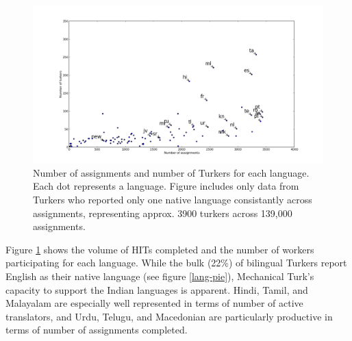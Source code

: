 \documentclass[11pt]{article}
\begin{document}
\begin{figure}[h]
\centering
\includegraphics[width=6in]{figures/assign-turk-scatter-new}
\caption{Number of assignments and number of Turkers for each language. Each dot represents a language. Figure includes only data from Turkers who reported only one native language consistantly across assignments, representing approx. 3900 turkers across 139,000 assignments.}
\label{ass-scatter}
\end{figure}



Figure \ref{ass-scatter} shows the volume of HITs completed and the number of workers participating for each language. While the bulk (22\%) of bilingual Turkers report English as their native language (see figure \ref{lang-pie}), Mechanical Turk's capacity to support the Indian languages is apparent. Hindi, Tamil, and Malayalam are especially well represented in terms of number of active translators, and Urdu, Telugu, and Macedonian are particularly productive in terms of number of assignments completed. %

\end{document}

